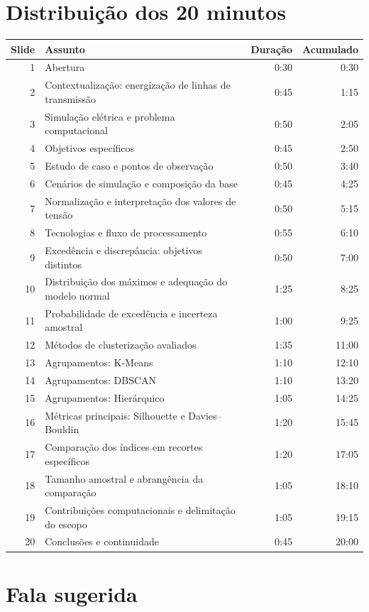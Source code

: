 \documentclass[11pt,a4paper]{article}
\begin{document}
\section*{Distribuição dos 20 minutos}
\begin{longtable}{r p{9cm} r r}
\toprule
Slide & Assunto & Duração & Acumulado \\
\midrule
1 & Abertura & 0:30 & 0:30 \\
2 & Contextualização: energização de linhas de transmissão & 0:45 & 1:15 \\
3 & Simulação elétrica e problema computacional & 0:50 & 2:05 \\
4 & Objetivos específicos & 0:45 & 2:50 \\
5 & Estudo de caso e pontos de observação & 0:50 & 3:40 \\
6 & Cenários de simulação e composição da base & 0:45 & 4:25 \\
7 & Normalização e interpretação dos valores de tensão & 0:50 & 5:15 \\
8 & Tecnologias e fluxo de processamento & 0:55 & 6:10 \\
9 & Excedência e discrepância: objetivos distintos & 0:50 & 7:00 \\
10 & Distribuição dos máximos e adequação do modelo normal & 1:25 & 8:25 \\
11 & Probabilidade de excedência e incerteza amostral & 1:00 & 9:25 \\
12 & Métodos de clusterização avaliados & 1:35 & 11:00 \\
13 & Agrupamentos: K-Means & 1:10 & 12:10 \\
14 & Agrupamentos: DBSCAN & 1:10 & 13:20 \\
15 & Agrupamentos: Hierárquico & 1:05 & 14:25 \\
16 & Métricas principais: Silhouette e Davies--Bouldin & 1:20 & 15:45 \\
17 & Comparação dos índices em recortes específicos & 1:20 & 17:05 \\
18 & Tamanho amostral e abrangência da comparação & 1:05 & 18:10 \\
19 & Contribuições computacionais e delimitação do escopo & 1:05 & 19:15 \\
20 & Conclusões e continuidade & 0:45 & 20:00 \\
\bottomrule
\end{longtable}

\section*{Fala sugerida}
\end{document}
